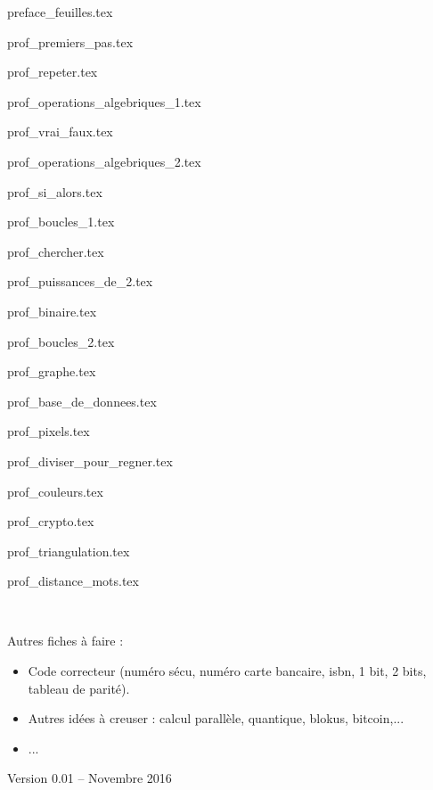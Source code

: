\documentclass[11pt]{report}
\begin{document}
\renewcommand{\contentsname}{Sommaire}

{preface_feuilles.tex}

\debutchapitres



{prof_premiers_pas.tex}

{prof_repeter.tex}

{prof_operations_algebriques_1.tex}

{prof_vrai_faux.tex}

{prof_operations_algebriques_2.tex}

{prof_si_alors.tex} 

{prof_boucles_1.tex} 

{prof_chercher.tex}

{prof_puissances_de_2.tex} 

{prof_binaire.tex}

{prof_boucles_2.tex} 

{prof_graphe.tex}

{prof_base_de_donnees.tex}

{prof_pixels.tex}

{prof_diviser_pour_regner.tex}

{prof_couleurs.tex}

{prof_crypto.tex}

{prof_triangulation.tex}

{prof_distance_mots.tex}

\newpage
\ 
\vfill

Autres fiches à faire :\\[1ex]
\begin{itemize}

  \item Code correcteur (numéro sécu, numéro carte bancaire, isbn, 1 bit, 2 bits, tableau de parité).
  
  \item Autres idées à creuser : calcul parallèle, quantique, blokus, bitcoin,...
  
  \item ...
\end{itemize}

\vspace*{5cm}

\centerline{Version 0.01 -- Novembre 2016}

\vspace*{1cm}
\end{document}
